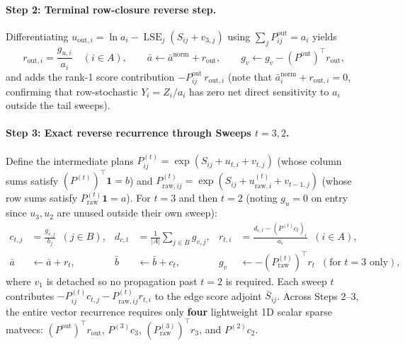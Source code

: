 \documentclass[11pt]{article}
\newcommand{\one}{\mathbf{1}}
\begin{document}
\paragraph{Step 2: Terminal row-closure reverse step.}
Differentiating $u_{\text{out},i} = \ln a_i - \operatorname{LSE}_j(S_{ij} + v_{3,j})$ using $\sum_j P^{\text{out}}_{ij} = a_i$ yields
\begin{equation}
  r_{\text{out},i} = \frac{g_{u,i}}{a_i} \quad (i \in A), \qquad
  \bar{a} \leftarrow \bar{a}^{\text{norm}} + r_{\text{out}}, \qquad
  g_v \leftarrow g_v - (P^{\text{out}})^\top r_{\text{out}},
  \label{eq:app-row-closure}
\end{equation}
and adds the rank-1 score contribution $-P^{\text{out}}_{ij}\, r_{\text{out},i}$ (note that $\bar{a}^{\text{norm}}_i + r_{\text{out},i} = 0$, confirming that row-stochastic $Y_i = Z_i/a_i$ has zero net direct sensitivity to $a_i$ outside the tail sweeps).

\paragraph{Step 3: Exact reverse recurrence through Sweeps $t = 3, 2$.}
Define the intermediate plans $P^{(t)}_{ij} = \exp(S_{ij} + u_{t,i} + v_{t,j})$ (whose column sums satisfy $(P^{(t)})^\top \one = b$) and $P^{(t)}_{\text{raw},ij} = \exp(S_{ij} + u^{(t)}_{\text{raw},i} + v_{t-1,j})$ (whose row sums satisfy $P^{(t)}_{\text{raw}} \one = a$). For $t = 3$ and then $t = 2$ (noting $g_u = 0$ on entry since $u_3, u_2$ are unused outside their own sweep):
\begin{align}
  c_{t,j} &= \frac{g_{v,j}}{b_j} \;\; (j \in B), &
  d_{c,t} &= \frac{1}{|A|} \sum_{j \in B} g_{v,j}, &
  r_{t,i} &= \frac{d_{c,t} - (P^{(t)} c_t)_i}{a_i} \;\; (i \in A), \label{eq:app-rev-step}\\
  \bar{a} &\leftarrow \bar{a} + r_t, &
  \bar{b} &\leftarrow \bar{b} + c_t, &
  g_v &\leftarrow -(P^{(t)}_{\text{raw}})^\top r_t \;\; (\text{for } t = 3 \text{ only}), \nonumber
\end{align}
where $v_1$ is detached so no propagation past $t=2$ is required. Each sweep $t$ contributes $-P^{(t)}_{ij} c_{t,j} - P^{(t)}_{\text{raw},ij} r_{t,i}$ to the edge score adjoint $\bar{S}_{ij}$. Across Steps 2--3, the entire vector recurrence requires only \textbf{four} lightweight 1D scalar sparse matvecs: $(P^{\text{out}})^\top r_{\text{out}}$, $P^{(3)} c_3$, $(P^{(3)}_{\text{raw}})^\top r_3$, and $P^{(2)} c_2$.
\end{document}
